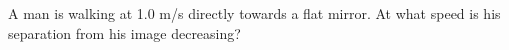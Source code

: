 \answercheck A man is walking at 1.0 m/s directly towards a flat
mirror. At what speed is his separation from his image decreasing?
